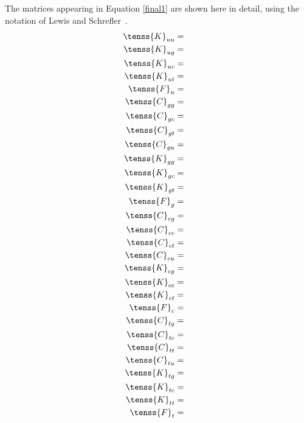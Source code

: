 The matrices appearing in Equation \eqref{final1} are shown here in detail, using the notation of Lewis and Schrefler~\cite{lewis}.
\begin{eqnarray}
\tenss{K}_{uu} &=&\\
\tenss{K}_{ug} &=&\\
\tenss{K}_{uc} &=&\\
\tenss{K}_{ut} &=&\\
\tenss{F}_u &=&\\
\tenss{C}_{gg} &=&\\
\tenss{C}_{gc} &=&\\
\tenss{C}_{gt} &=&\\
\tenss{C}_{gu} &=&\\ 
\tenss{K}_{gg} &=&\\
\tenss{K}_{gc} &=&\\
\tenss{K}_{gt} &=&\\
\tenss{F}_g &=&\\
\tenss{C}_{cg} &=&\\
\tenss{C}_{cc} &=&\\
\tenss{C}_{ct} &=&\\
\tenss{C}_{cu} &=&\\ 
\tenss{K}_{cg} &=&\\
\tenss{K}_{cc} &=&\\
\tenss{K}_{ct} &=&\\
\tenss{F}_c &=&\\
\tenss{C}_{tg} &=&\\
\tenss{C}_{tc} &=&\\
\tenss{C}_{tt} &=&\\
\tenss{C}_{tu} &=&\\ 
\tenss{K}_{tg} &=&\\
\tenss{K}_{tc} &=&\\
\tenss{K}_{tt} &=&\\
\tenss{F}_t &=&
\end{eqnarray}
